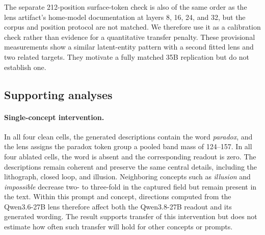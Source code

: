 \documentclass[10pt,a4paper,twocolumn]{article}
\begin{document}
\begin{table}[t]
\centering
\scriptsize
\setlength{\tabcolsep}{3pt}
\caption{Exploratory 35B follow-up on the same 40 two-hop prompts. Entries
are median first-token target ranks (lower is better) for the
Qwen3.6-35B-A3B lens applied unchanged. The protocol reports the
latent-entity evaluation only.}
\label{tab:35b}
\end{table}

The separate 212-position surface-token check is also of the same order as
the lens artifact's home-model documentation at layers 8, 16, 24, and 32,
but the corpus and position protocol are not matched. We therefore use it as
a calibration check rather than evidence for a quantitative transfer
penalty. These provisional measurements show a similar latent-entity pattern
with a second fitted lens and two related targets. They motivate a fully
matched 35B replication but do not establish one.

\subsection{Supporting analyses}

\paragraph{Single-concept intervention.}
In all four clean cells, the generated descriptions contain the word
\emph{paradox}, and the lens assigns the paradox token group a pooled band
mass of 124--157. In all four ablated cells, the word is absent and the
corresponding readout is zero. The descriptions remain coherent and preserve
the same central details, including the lithograph, closed loop, and illusion.
Neighboring concepts such as \emph{illusion} and \emph{impossible} decrease
two- to three-fold in the captured field but remain present in the text.
Within this prompt and concept, directions computed from the Qwen3.6-27B lens
therefore affect both the Qwen3.8-27B readout and its generated wording. The
result supports transfer of this intervention but does not estimate how often
such transfer will hold for other concepts or prompts.
\end{document}
